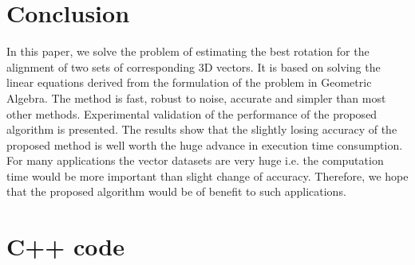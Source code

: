 \documentclass{birkjour}
\numberwithin{equation}{section}
\begin{document}

\section{Conclusion}
In this paper, we solve the problem of estimating the best rotation for the alignment of two sets of corresponding 3D vectors. It is based on solving the linear equations derived from the formulation of the problem in Geometric Algebra. The method is fast, robust to noise, accurate and simpler than most other methods. Experimental validation of the performance of the proposed algorithm is presented. The results show that the slightly losing accuracy of the proposed method is well worth the huge advance in execution time consumption. For many applications the vector datasets are very huge i.e. the computation time would be more important than slight change of accuracy. Therefore, we hope that the proposed algorithm would be of benefit to such applications.


\section{C++ code}
\end{document}
